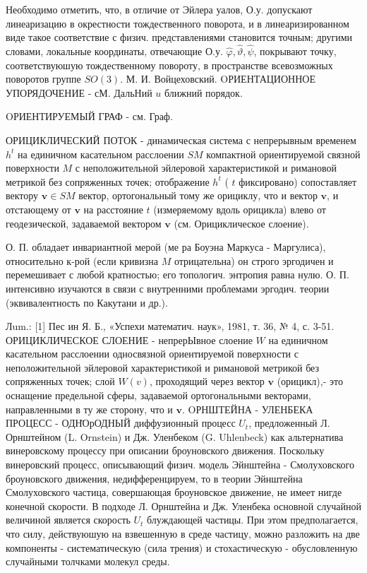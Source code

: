 \documentclass[10pt]{article}
\begin{document}
Необходимо отметить, что, в отличие от Эйлера уалов, О.у. допускают линеаризацию в окрестности тождественного поворота, и в линеаризированном виде такое соответствие с физич. представлениями становится точным; другими словами, локальные координаты, отвечающие О.у. $\hat{\varphi}, \hat{\vartheta}, \hat{\psi}$, покрывают точку, соответствуюшую тождественному повороту, в пространстве всевозможных поворотов группе $S O(3)$. М. И. Войцеховский. OРИЕНТАЦИОННОЕ УПОРЯДОЧЕНИЕ - сМ. ДальНий $u$ ближний порядок.



OРИЕНТИРУЕМЫЙ ГРАФ - см. Граф.



ОРИЦИКЛИЧЕСКИЙ ПОТОК - динамическая система с непрерывным временем $h^{t}$ на единичном касательном расслоении $S M$ компактной ориентируемой связной поверхности $M$ с неположительной эйлеровой характеристикой и римановой метрикой без сопряженных точек; отображение $h^{t}$ ( $t$ фиксировано) сопоставляет вектору $\boldsymbol{v} \in S M$ вектор, ортогональный тому же орициклу, что и вектор $\boldsymbol{v}$, и отстающему от $\boldsymbol{v}$ на расстояние $t$ (измеряемому вдоль орицикла) влево от геодезической, задаваемой вектором $\boldsymbol{v}$ (см. Орициклическое слоение).



О. П. обладает инвариантной мерой (ме ра Боуэна Маркуса - Маргулиса), относительно к-рой (если кривизна $M$ отрицательна) он строго эргодичен и перемешивает с любой кратностью; его топологич. энтропия равна нулю. О. П. интенсивно изучаются в связи с внутренними проблемами эргодич. теории (эквивалентность по Какутани и др.).



Лum.: [1] Пес ин Я. Б., «Успехи математич. наук», 1981, т. 36, № 4, с. 3-51. ОРИЦИКЛИЧЕСКОЕ СЛОЕНИЕ - непрерЫвное слоение $W$ на единичном касательном расслоении односвязной ориентируемой поверхности с неположительной эйлеровой характеристикой и римановой метрикой без сопряженных точек; слой $W(v)$, проходящий через вектор $\boldsymbol{v}$ (орицикл),- это оснащение предельной сферы, задаваемой ортогональными векторами, направленными в ту же сторону, что и $\boldsymbol{v}$. OРНШТЕЙНА - УЛЕНБЕКА ПРОЦЕСС - ОДН̈ОрОДНЫЙ диффузионный процесс $U_{t}$, предложенный Л. Орнштейном (L. Ornstein) и Дж. Уленбеком (G. Uhlenbeck) как альтернатива винеровскому процессу при описании броуновского движения. Поскольку винеровский процесс, описывающий физич. модель Эйнштейна - Смолуховского броуновского движения, недифференцируем, то в теории Эйнштейна Смолуховского частица, совершающая броуновское движение, не имеет нигде конечной скорости. В подходе Л. Орнштейна и Дж. Уленбека основной случайной величиной является скорость $U_{t}$ блуждающей частицы. При этом предполагается, что силу, действуюшую на взвешенную в среде частицу, можно разложить на две компоненты - систематическую (сила трения) и стохастическую - обусловленную случайными толчками молекул среды.
\end{document}
